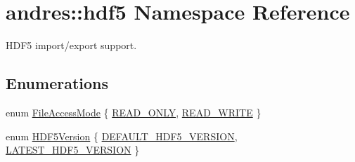 \hypertarget{namespaceandres_1_1hdf5}{}\section{andres\+:\+:hdf5 Namespace Reference}
\label{namespaceandres_1_1hdf5}


H\+D\+F5 import/export support.  


\subsection*{Enumerations}
\begin{DoxyCompactItemize}
\item 
enum \hyperlink{namespaceandres_1_1hdf5_a08660935c7de0e1e76e007fc972933b9}{File\+Access\+Mode} \{ \hyperlink{namespaceandres_1_1hdf5_a08660935c7de0e1e76e007fc972933b9af05cb745b770e55c64efe88162f7e9fb}{R\+E\+A\+D\+\_\+\+O\+N\+L\+Y}, 
\hyperlink{namespaceandres_1_1hdf5_a08660935c7de0e1e76e007fc972933b9af215ccdde9335c237c14b7c1d35766d4}{R\+E\+A\+D\+\_\+\+W\+R\+I\+T\+E}
 \}
\item 
enum \hyperlink{namespaceandres_1_1hdf5_ad5194a7b8773d3776e8dfc068f58f41b}{H\+D\+F5\+Version} \{ \hyperlink{namespaceandres_1_1hdf5_ad5194a7b8773d3776e8dfc068f58f41baf4fdc18c306e5d07105ad62a1cf6fa93}{D\+E\+F\+A\+U\+L\+T\+\_\+\+H\+D\+F5\+\_\+\+V\+E\+R\+S\+I\+O\+N}, 
\hyperlink{namespaceandres_1_1hdf5_ad5194a7b8773d3776e8dfc068f58f41ba29da3f0202bdf4ea2b036678ae7aa717}{L\+A\+T\+E\+S\+T\+\_\+\+H\+D\+F5\+\_\+\+V\+E\+R\+S\+I\+O\+N}
 \}
\end{DoxyCompactItemize}

